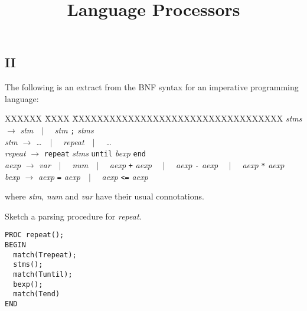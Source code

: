 \withmodelanswers

\begin{preamble}
\part{II}
\title{Language Processors}
\end{preamble}

\begin{questions}


\newenvironment{bnf}{
    \begin{tabbing}
    XXXXXX \= XXXX \= XXXXXXXXXXXXXXXXXXXXXXXXXXXXXXXXXX\kill}{
    \end{tabbing}
    }

\newcommand{\nt}[1]{{\it #1\/}}
\newcommand{\Or}[1]{\ \ $|$ \ \ #1}
\newcommand{\Rule}[2]{{\it #1} \> $\rightarrow$ \> #2}

\question

The following is an extract from the BNF syntax for
an imperative programming language:
\begin{bnf}
\Rule{\nt{stms}}{\nt{stm}\Or{\nt{stm} \verb";" \nt{stms}}}\\
\Rule{\nt{stm}}{\nt{\dots}\Or{\nt{repeat}}\Or{\nt{\ldots}}} \\
\Rule{\nt{repeat}}{\verb"repeat" \nt{stms$$} \verb"until" \nt{bexp} \verb"end"}\\
\Rule{\nt{aexp}}{\nt{var}\Or{\nt{num}}\Or{\nt{aexp} \verb"+" \nt{aexp}}
        \Or{\nt{aexp} \verb"-" \nt{aexp}} \Or{\nt{aexp} \verb"*" \nt{aexp}}}\\
\Rule{\nt{bexp}}{\nt{aexp} \verb"=" \nt{aexp}\Or{\nt{aexp} \verb"<=" \nt{aexp}}}
\end{bnf}
where \nt{stm}, \nt{num} and \nt{var} have their usual connotations.
\begin{subquestions}
\subquestion
Sketch a parsing procedure for \nt{repeat}.
\begin{modelanswer}
\begin{verbatim}
PROC repeat();
BEGIN
  match(Trepeat);
  stms();
  match(Tuntil);
  bexp();
  match(Tend)
END
\end{verbatim}
\end{modelanswer}


\end{subquestions}
\end{questions}
